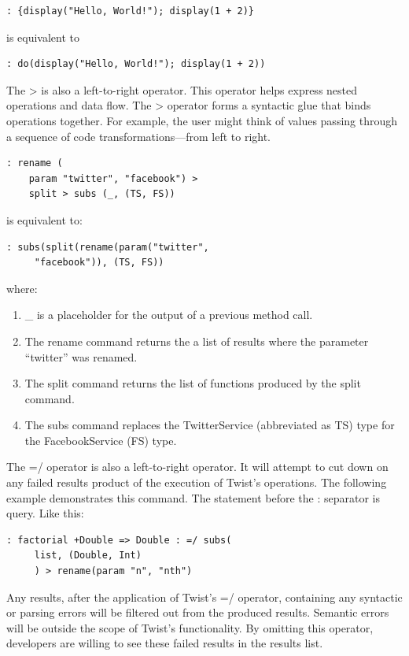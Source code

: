 \begin{verbatim}
: {display("Hello, World!"); display(1 + 2)}
\end{verbatim}

is equivalent to

\begin{verbatim}
: do(display("Hello, World!"); display(1 + 2))
\end{verbatim}

The > is also a left-to-right operator. This operator helps express nested operations and data flow.  The > operator forms a syntactic glue that binds operations together. For example, the user might think of values passing through a sequence of code transformations---from left to right.

\begin{verbatim}
: rename (
	param "twitter", "facebook") > 
	split > subs (_, (TS, FS))
\end{verbatim}

is equivalent to:

\begin{verbatim}
: subs(split(rename(param("twitter", 
	 "facebook")), (TS, FS))
\end{verbatim}

where:

\begin{enumerate}
	\item \_ is a placeholder for the output of a previous method call.
	\item The rename command returns the a list of results where the parameter   		``twitter'' was renamed.
	\item The split command returns the list of functions produced by the split command.
	\item The subs command replaces the TwitterService (abbreviated as TS) type for the 
	FacebookService (FS) type.
\end{enumerate}

The =/ operator is also a left-to-right operator. It will attempt to cut down on any failed results product of the execution of Twist's operations. The following example demonstrates this command. The statement before the : separator is query. Like this:

\begin{verbatim}
: factorial +Double => Double : =/ subs(
	 list, (Double, Int)
	 ) > rename(param "n", "nth") 
\end{verbatim}

Any results, after the application of Twist's =/ operator, containing any syntactic or parsing errors will be filtered out from the produced results. Semantic errors will be outside the scope of Twist's functionality. By omitting this operator, developers are willing to see these failed results in the results list.

